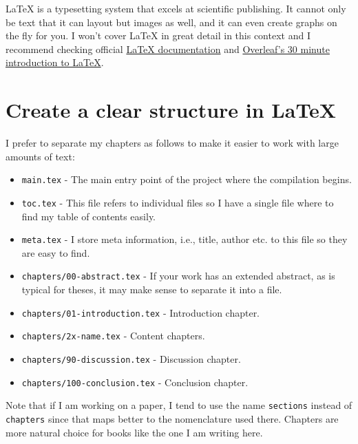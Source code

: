 LaTeX is a typesetting system that excels at scientific publishing.
It cannot only be text that it can layout but images as well, and it can even create graphs on the fly for you.
I won't cover LaTeX in great detail in this context and I recommend checking official \href{https://www.latex-project.org/}{LaTeX documentation} and \href{https://www.overleaf.com/learn/latex/Learn_LaTeX_in_30_minutes}{Overleaf's 30 minute introduction to LaTeX}. %

\section{Create a clear structure in LaTeX}
\label{sec:creating-a-structure}


I prefer to separate my chapters as follows to make it easier to work with large amounts of text:

\begin{itemize}
    \item \texttt{main.tex} - The main entry point of the project where the compilation begins. %
    \item \texttt{toc.tex} - This file refers to individual files so I have a single file where to find my table of contents easily.
    \item \texttt{meta.tex} - I store meta information, i.e., title, author etc. to this file so they are easy to find.
    \item \texttt{chapters/00-abstract.tex} - If your work has an extended abstract, as is typical for theses, it may make sense to separate it into a file.
    \item \texttt{chapters/01-introduction.tex} - Introduction chapter.
    \item \texttt{chapters/2x-name.tex} - Content chapters.
    \item \texttt{chapters/90-discussion.tex} - Discussion chapter.
    \item \texttt{chapters/100-conclusion.tex} - Conclusion chapter.
\end{itemize}

Note that if I am working on a paper, I tend to use the name \texttt{sections} instead of \texttt{chapters} since that maps better to the nomenclature used there.
Chapters are more natural choice for books like the one I am writing here.

